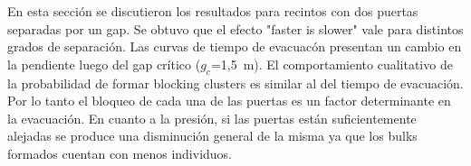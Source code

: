 En esta sección se discutieron los resultados para recintos con dos puertas separadas por un gap. Se obtuvo que el efecto "faster is slower" vale para distintos grados de separación. Las curvas de tiempo de evacuacón presentan un cambio en la pendiente luego del gap crítico ($g_c$=1,5~m). El comportamiento cualitativo de la probabilidad de formar blocking clusters es similar al del tiempo de evacuación. Por lo tanto el bloqueo de cada una de las puertas es un factor determinante en la evacuación. En cuanto a la presión, si las puertas están suficientemente alejadas se produce una disminución general de la misma ya que los bulks formados cuentan con menos individuos. 
